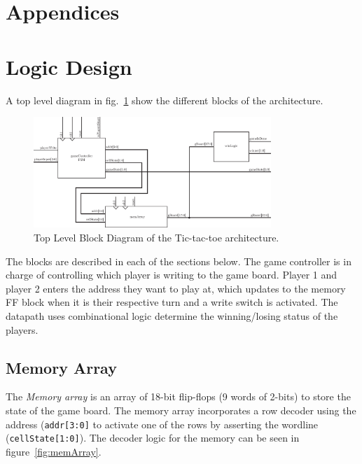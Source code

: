 \documentclass[]{article}
\begin{document}
\section*{Appendices}
\appendix


\section{Logic Design}
A top level diagram in fig.~\ref{fig:top-level} show the different blocks of the architecture.

\begin{figure}[b]
\centering
\includegraphics[width=0.8\textwidth]{top-level}
\caption{Top Level Block Diagram of the Tic-tac-toe architecture.}
\label{fig:top-level}
\end{figure}
The blocks are described in each of the sections below. The game controller is in charge of controlling which player is writing to the game board. Player 1 and player 2 enters the address they want to play at, which updates to the memory FF block when it is their respective turn and a write switch is activated. The datapath uses combinational logic determine the winning/losing status of the players.

\subsection{Memory Array}
The \emph{Memory array} is an array of 18-bit flip-flops (9 words of 2-bits) to store the state of the game board. The memory array incorporates a row decoder using the address (\texttt{addr[3:0]} to activate one of the rows by asserting the wordline (\texttt{cellState[1:0]}). The decoder logic for the memory can be seen in figure~\ref{fig:memArray}.
\end{document}

